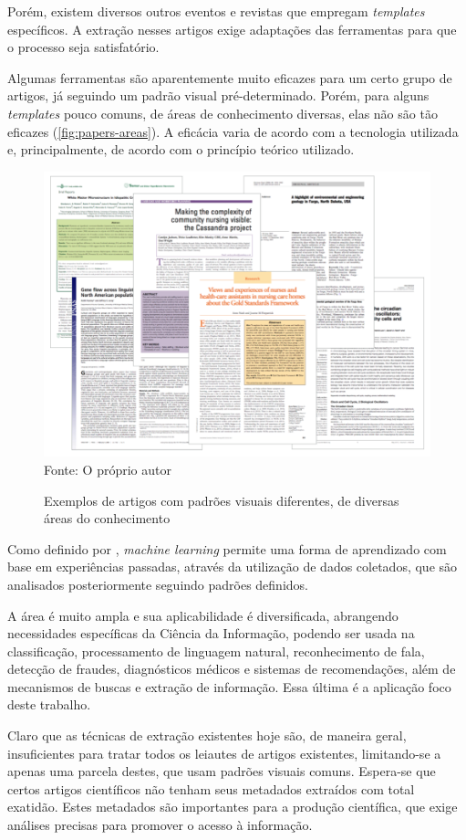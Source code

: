 Porém, existem diversos outros eventos e revistas que empregam \textit{templates} específicos. A extração nesses artigos exige adaptações das ferramentas para que o processo seja satisfatório.

Algumas ferramentas são aparentemente muito eficazes para um certo grupo de artigos, já seguindo um padrão visual pré-determinado. Porém, para alguns \textit{templates} pouco comuns, de áreas de conhecimento diversas, elas não são tão eficazes (\autoref{fig:papers-areas}). A eficácia varia de acordo com a tecnologia utilizada e, principalmente, de acordo com o princípio teórico utilizado.

\begin{figure}[h!]
    \centering
    \caption{Exemplos de artigos com padrões visuais diferentes, de diversas áreas do conhecimento}
    \label{fig:papers-areas}
    \includegraphics[width=0.7\linewidth]{./assets/images/papers-areas}
    \center\footnotesize{Fonte: O próprio autor}
\end{figure}

Como definido por \cite{foundations-machine-learning}, \textit{machine learning} permite uma forma de aprendizado com base em experiências passadas, através da utilização de dados coletados, que são analisados posteriormente seguindo padrões definidos.

A área é muito ampla e sua aplicabilidade é diversificada, abrangendo necessidades específicas da Ciência da Informação, podendo ser usada na classificação, processamento de linguagem natural, reconhecimento de fala, detecção de fraudes, diagnósticos médicos e sistemas de recomendações, além de mecanismos de buscas e extração de informação. Essa última é a aplicação foco deste trabalho.

Claro que as técnicas de extração existentes hoje são, de maneira geral, insuficientes para tratar todos os leiautes de artigos existentes, limitando-se a apenas uma parcela destes, que usam padrões visuais comuns. Espera-se que certos artigos científicos não tenham seus metadados extraídos com total exatidão. Estes metadados são importantes para a produção científica, que exige  análises precisas para promover o acesso à informação.

